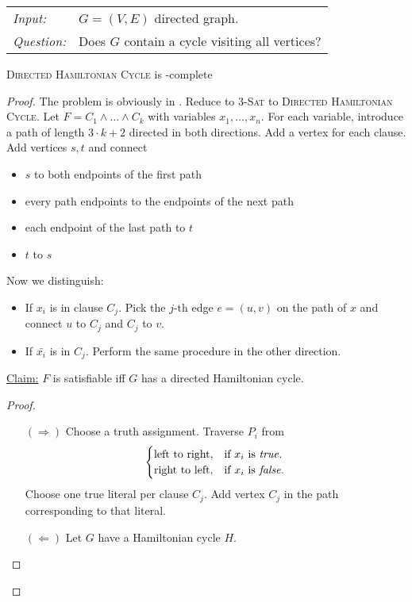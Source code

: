 \documentclass[../skript.tex]{subfiles}
\begin{document}
\begin{problem}
\begin{tabular}{@{}ll}
\textit{Input:} & $G = (V, E)$ directed graph. \\
\textit{Question:} & Does $G$ contain a cycle visiting all vertices?
\end{tabular}
\end{problem}
\begin{theorem} %
\label{thm:6}
\textsc{Directed Hamiltonian Cycle} is \NP-complete
\end{theorem}
\begin{proof}
The problem is obviously in \NP.
Reduce to \textsc{3-Sat} to \textsc{Directed Hamiltonian Cycle}. Let $F = C_1 \wedge \ldots \wedge C_k$ with variables $x_1, \ldots, x_n$.
For each variable, introduce a path of length $3 \cdot k + 2$ directed in both directions.
Add a vertex for each clause. Add vertices $s, t$ and connect
\begin{itemize}
\item $s$ to both endpoints of the first path
\item every path endpoints to the endpoints of the next path
\item each endpoint of the last path to $t$
\item $t$ to $s$
\end{itemize}
Now we distinguish:
\begin{itemize}
\item If $x_i$ is in clause $C_j$. Pick the $j$-th edge $e = (u, v)$ on the path of $x$ and connect $u$ to $C_j$ and $C_j$ to $v$.
\item If $\bar{x_i}$ is in $C_j$. Perform the same procedure in the other direction.
\end{itemize}
\underline{Claim:} $F$ is satisfiable \ac{iff} $G$ has a directed Hamiltonian cycle.
\begin{proof}
\begin{itemize}
\item[$(\Rightarrow)$] Choose a truth assignment. Traverse $P_i$ from
\[
\begin{cases}
\text{left to right}, & \text{if } x_i \text{ is \textit{true}}. \\
\text{right to left}, & \text{if } x_i \text{ is \textit{false}}.
\end{cases}
\]
Choose one true literal per clause $C_j$. Add vertex $C_j$ in the path corresponding to that literal.
\item[$(\Leftarrow)$] Let $G$ have a Hamiltonian cycle $H$. \\

\end{itemize}
\end{proof}
\end{proof}
\end{document}
